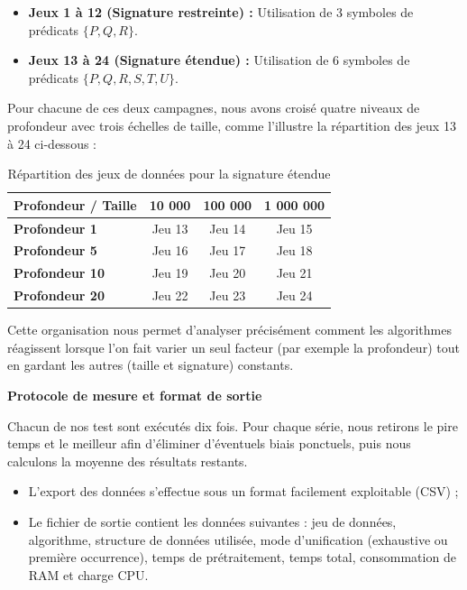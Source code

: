 \documentclass[11pt]{article}
\begin{document}
    \begin{itemize}
        \item \textbf{Jeux 1 à 12 (Signature restreinte) :} Utilisation de 3 symboles de prédicats $\{P, Q, R\}$.
        \item \textbf{Jeux 13 à 24 (Signature étendue) :} Utilisation de 6 symboles de prédicats $\{P, Q, R, S, T, U\}$.
    \end{itemize}

    \newpage

    Pour chacune de ces deux campagnes, nous avons croisé quatre niveaux de profondeur avec trois échelles de taille, comme l'illustre la répartition des jeux 13 à 24 ci-dessous :

    \begin{table}[H]
    \centering
    \begin{tabular}{|l|c|c|c|}
    \hline
    \textbf{Profondeur / Taille} & \textbf{10 000} & \textbf{100 000} & \textbf{1 000 000} \\ \hline
    \textbf{Profondeur 1}        & Jeu 13          & Jeu 14           & Jeu 15             \\ \hline
    \textbf{Profondeur 5}        & Jeu 16          & Jeu 17           & Jeu 18             \\ \hline
    \textbf{Profondeur 10}       & Jeu 19          & Jeu 20           & Jeu 21             \\ \hline
    \textbf{Profondeur 20}       & Jeu 22          & Jeu 23           & Jeu 24             \\ \hline
    \end{tabular}
    \caption{Répartition des jeux de données pour la signature étendue}
    \end{table}

    Cette organisation nous permet d'analyser précisément comment les algorithmes réagissent lorsque l'on fait varier un seul facteur (par exemple la profondeur) tout en gardant les autres (taille et signature) constants.
    
\vspace{0.2cm}
\textbf{Protocole de mesure et format de sortie}

    Chacun de nos test sont exécutés dix fois. Pour chaque série, nous retirons le pire temps et le meilleur afin d'éliminer d'éventuels biais ponctuels, puis nous calculons la moyenne des résultats restants.

    \begin{itemize}
        \item L'export des données s'effectue sous un format facilement exploitable (CSV) ;
        \item Le fichier de sortie contient les données suivantes : jeu de données, algorithme, structure de données utilisée, mode d'unification (exhaustive ou première occurrence), temps de prétraitement, temps total, consommation de RAM et charge CPU.
    \end{itemize}
\end{document}
